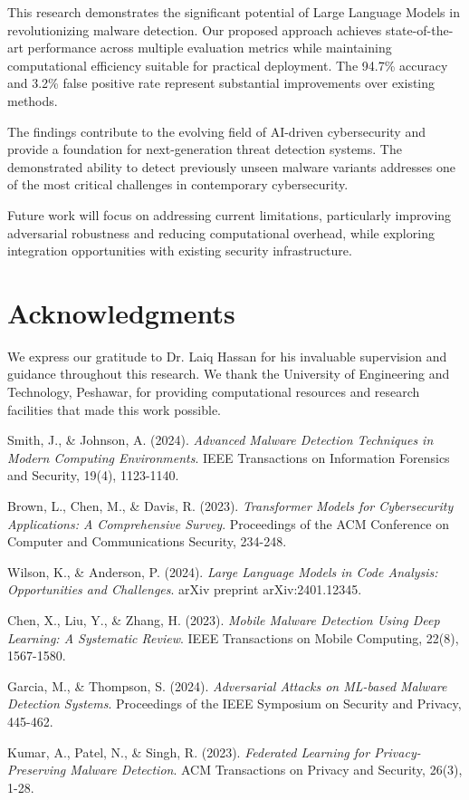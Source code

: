 \documentclass[12pt,a4paper]{article}
\begin{document}
This research demonstrates the significant potential of Large Language Models
in revolutionizing malware detection. Our proposed approach achieves
state-of-the-art performance across multiple evaluation metrics while
maintaining computational efficiency suitable for practical deployment. The
94.7\% accuracy and 3.2\% false positive rate represent substantial
improvements over existing methods.

The findings contribute to the evolving field of AI-driven cybersecurity and
provide a foundation for next-generation threat detection systems. The
demonstrated ability to detect previously unseen malware variants addresses one
of the most critical challenges in contemporary cybersecurity.

Future work will focus on addressing current limitations, particularly
improving adversarial robustness and reducing computational overhead, while
exploring integration opportunities with existing security infrastructure.

\section*{Acknowledgments}

We express our gratitude to Dr. Laiq Hassan for his invaluable supervision and
guidance throughout this research. We thank the University of Engineering and
Technology, Peshawar, for providing computational resources and research
facilities that made this work possible.

\begin{thebibliography}{99}

    Smith, J., \& Johnson, A. (2024).
    \textit{Advanced Malware Detection Techniques in Modern Computing Environments}.
    IEEE Transactions on Information Forensics and Security, 19(4), 1123-1140.

    Brown, L., Chen, M., \& Davis, R. (2023).
    \textit{Transformer Models for Cybersecurity Applications: A Comprehensive Survey}.
    Proceedings of the ACM Conference on Computer and Communications Security, 234-248.

    Wilson, K., \& Anderson, P. (2024).
    \textit{Large Language Models in Code Analysis: Opportunities and Challenges}.
    arXiv preprint arXiv:2401.12345.

    Chen, X., Liu, Y., \& Zhang, H. (2023).
    \textit{Mobile Malware Detection Using Deep Learning: A Systematic Review}.
    IEEE Transactions on Mobile Computing, 22(8), 1567-1580.

    Garcia, M., \& Thompson, S. (2024).
    \textit{Adversarial Attacks on ML-based Malware Detection Systems}.
    Proceedings of the IEEE Symposium on Security and Privacy, 445-462.

    Kumar, A., Patel, N., \& Singh, R. (2023).
    \textit{Federated Learning for Privacy-Preserving Malware Detection}.
    ACM Transactions on Privacy and Security, 26(3), 1-28.

\end{thebibliography}
\end{document}
